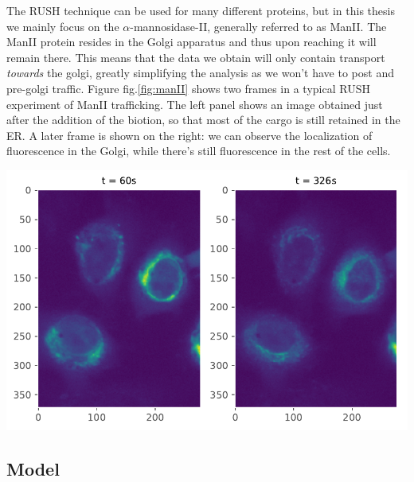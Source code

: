 \documentclass{Dissertate}
\let\origfigure\figure
\let\endorigfigure\endfigure
\renewenvironment{figure}[1][2] {
    \expandafter\origfigure\expandafter[H]
} {
    \endorigfigure
}
\begin{document}
The RUSH technique can be used for many different proteins, but in this
thesis we mainly focus on the \(\alpha\)-mannosidase-II, generally
referred to as ManII. The ManII protein resides in the Golgi apparatus
and thus upon reaching it will remain there. This means that the data we
obtain will only contain transport \emph{towards} the golgi, greatly
simplifying the analysis as we won't have to post and pre-golgi traffic.
Figure fig.\ref{fig:manII} shows two frames in a typical RUSH
experiment of ManII trafficking. The left panel shows an image obtained
just after the addition of the biotion, so that most of the cargo is
still retained in the ER. A later frame is shown on the right: we can
observe the localization of fluorescence in the Golgi, while there's
still fluorescence in the rest of the cells.

\begin{figure}
\hypertarget{fig:manII}{%
\centering
\includegraphics{source/figures/pdf/frames.pdf}
\caption{Two frames of the ManII transport images using the RUSH
technique.}\label{fig:manII}
}
\end{figure}

\hypertarget{model}{%
\subsection{Model}\label{model}}
\end{document}
